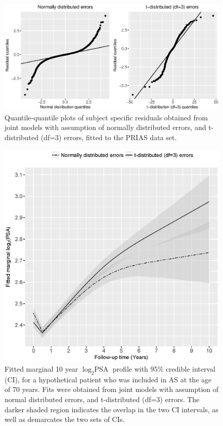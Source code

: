 \begin{enumerate}
    \begin{figure}[!htb]
    \centerline{\includegraphics[width=\columnwidth]{../images/model_fit/qqplot_norm_t3.eps}}
    \caption{Quantile-quantile plots of subject specific residuals obtained from joint models with assumption of normally distributed errors, and t-distributed (df=3) errors, fitted to the PRIAS data set.}
    \label{fig : qqplot_norm_t3_ref2}
    \end{figure}

\begin{figure}[!htb]
    \centerline{\includegraphics[width=0.75\columnwidth]{../images/model_fit/marginal_fitted_psa_NormalVsT3.eps}}
    \caption{Fitted marginal 10 year $\log_2 \mbox{PSA}$ profile with 95\% credible interval (CI), for a hypothetical patient who was included in AS at the age of 70 years. Fits were obtained from joint models with assumption of normal distributed errors, and t-distributed (df=3) errors. The darker shaded region indicates the overlap in the two CI intervals, as well as demarcates the two sets of CIs.}
    \label{fig : marginal_fitted_psa_NormalVsT3_ref2}
    \end{figure}        
    

\end{enumerate}
